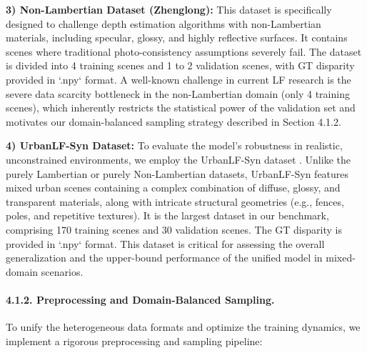 \documentclass[lettersize,journal]{IEEEtran}
\begin{document}
\textbf{3) Non-Lambertian Dataset (Zhenglong):} 
This dataset \cite{lytrolytro} is specifically designed to challenge depth estimation algorithms with non-Lambertian materials, including specular, glossy, and highly reflective surfaces. It contains scenes where traditional photo-consistency assumptions severely fail. The dataset is divided into 4 training scenes and 1 to 2 validation scenes, with GT disparity provided in `.npy` format. A well-known challenge in current LF research is the severe data scarcity bottleneck in the non-Lambertian domain (only 4 training scenes), which inherently restricts the statistical power of the validation set and motivates our domain-balanced sampling strategy described in Section 4.1.2.

\textbf{4) UrbanLF-Syn Dataset:} 
To evaluate the model's robustness in realistic, unconstrained environments, we employ the UrbanLF-Syn dataset \cite{learninglearn}. Unlike the purely Lambertian or purely Non-Lambertian datasets, UrbanLF-Syn features mixed urban scenes containing a complex combination of diffuse, glossy, and transparent materials, along with intricate structural geometries (e.g., fences, poles, and repetitive textures). It is the largest dataset in our benchmark, comprising 170 training scenes and 30 validation scenes. The GT disparity is provided in `.npy` format. This dataset is critical for assessing the overall generalization and the upper-bound performance of the unified model in mixed-domain scenarios.

\paragraph{4.1.2. Preprocessing and Domain-Balanced Sampling.}

To unify the heterogeneous data formats and optimize the training dynamics, we implement a rigorous preprocessing and sampling pipeline:
\end{document}
